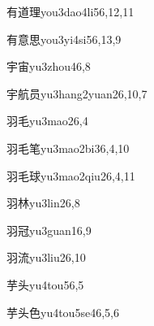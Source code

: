 \begin{verbete}{有道理}{you3dao4li5}{6,12,11}
\end{verbete}

\begin{verbete}{有意思}{you3yi4si5}{6,13,9}
\end{verbete}

\begin{verbete}{宇宙}{yu3zhou4}{6,8}
\end{verbete}

\begin{verbete}{宇航员}{yu3hang2yuan2}{6,10,7}
\end{verbete}

\begin{verbete}{羽毛}{yu3mao2}{6,4}
\end{verbete}

\begin{verbete}{羽毛笔}{yu3mao2bi3}{6,4,10}
\end{verbete}

\begin{verbete}{羽毛球}{yu3mao2qiu2}{6,4,11}
\end{verbete}

\begin{verbete}{羽林}{yu3lin2}{6,8}
\end{verbete}

\begin{verbete}{羽冠}{yu3guan1}{6,9}
\end{verbete}

\begin{verbete}{羽流}{yu3liu2}{6,10}
\end{verbete}

\begin{verbete}{芋头}{yu4tou5}{6,5}
\end{verbete}

\begin{verbete}{芋头色}{yu4tou5se4}{6,5,6}
\end{verbete}

